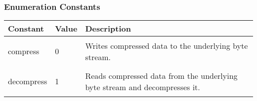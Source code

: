 \documentclass[a4paper,oneside,11.000000pt]{book}
\newcounter{subchapter}
\begin{document}
\subsubsection*{Enumeration Constants}
\begin{flushleft}
\begin{supertabular}[l]{!{\raggedright}p{2.61874cm}!{\raggedright}p{1.32877cm}!{\raggedright}p{8.5379cm}}
\textbf{Constant}
& \textbf{Value}
& \textbf{Description}
\\
\hline
\hypertarget{System.IO.Compression.CompressionMode.compress}{compress}
& 0
& Writes compressed data to the underlying byte stream.

\\
\hypertarget{System.IO.Compression.CompressionMode.decompress}{decompress}
& 1
& Reads compressed data from the underlying byte stream and decompresses it.

\\
\end{supertabular}

\end{flushleft}
\clearpage
{}
\end{document}

